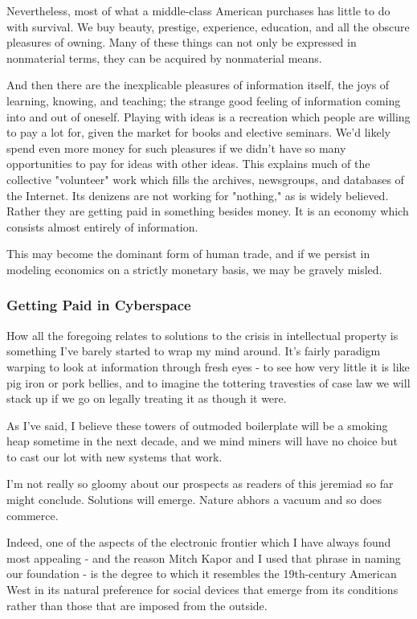\documentclass[
]{article}
\begin{document}
Nevertheless, most of what a middle-class American purchases has little
to do with survival. We buy beauty, prestige, experience, education, and
all the obscure pleasures of owning. Many of these things can not only
be expressed in nonmaterial terms, they can be acquired by nonmaterial
means.

And then there are the inexplicable pleasures of information itself, the
joys of learning, knowing, and teaching; the strange good feeling of
information coming into and out of oneself. Playing with ideas is a
recreation which people are willing to pay a lot for, given the market
for books and elective seminars. We'd likely spend even more money for
such pleasures if we didn't have so many opportunities to pay for ideas
with other ideas. This explains much of the collective "volunteer" work
which fills the archives, newsgroups, and databases of the Internet. Its
denizens are not working for "nothing," as is widely believed. Rather
they are getting paid in something besides money. It is an economy which
consists almost entirely of information.

This may become the dominant form of human trade, and if we persist in
modeling economics on a strictly monetary basis, we may be gravely
misled.

\hypertarget{header-n337}{%
\subsubsection{Getting Paid in Cyberspace}\label{header-n337}}

How all the foregoing relates to solutions to the crisis in intellectual
property is something I've barely started to wrap my mind around. It's
fairly paradigm warping to look at information through fresh eyes - to
see how very little it is like pig iron or pork bellies, and to imagine
the tottering travesties of case law we will stack up if we go on
legally treating it as though it were.

As I've said, I believe these towers of outmoded boilerplate will be a
smoking heap sometime in the next decade, and we mind miners will have
no choice but to cast our lot with new systems that work.

I'm not really so gloomy about our prospects as readers of this jeremiad
so far might conclude. Solutions will emerge. Nature abhors a vacuum and
so does commerce.

Indeed, one of the aspects of the electronic frontier which I have
always found most appealing - and the reason Mitch Kapor and I used that
phrase in naming our foundation - is the degree to which it resembles
the 19th-century American West in its natural preference for social
devices that emerge from its conditions rather than those that are
imposed from the outside.
\end{document}

